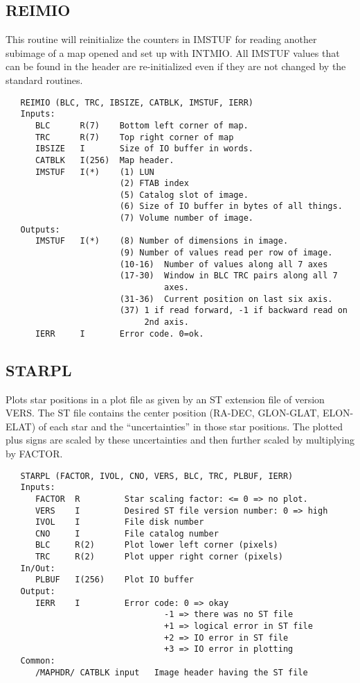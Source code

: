 \subsection{REIMIO}
This routine will reinitialize the counters in IMSTUF for reading
another subimage of a map opened and set up with INTMIO.  All
IMSTUF values that can be found in the header are re-initialized
even if they are not changed by the standard routines.
\begin{verbatim}
   REIMIO (BLC, TRC, IBSIZE, CATBLK, IMSTUF, IERR)
   Inputs:
      BLC      R(7)    Bottom left corner of map.
      TRC      R(7)    Top right corner of map
      IBSIZE   I       Size of IO buffer in words.
      CATBLK   I(256)  Map header.
      IMSTUF   I(*)    (1) LUN
                       (2) FTAB index
                       (5) Catalog slot of image.
                       (6) Size of IO buffer in bytes of all things.
                       (7) Volume number of image.
   Outputs:
      IMSTUF   I(*)    (8) Number of dimensions in image.
                       (9) Number of values read per row of image.
                       (10-16)  Number of values along all 7 axes
                       (17-30)  Window in BLC TRC pairs along all 7
                                axes.
                       (31-36)  Current position on last six axis.
                       (37) 1 if read forward, -1 if backward read on
                            2nd axis.
      IERR     I       Error code. 0=ok.

\end{verbatim}

\subsection{STARPL}
Plots star positions in a plot file as given by an ST
extension file of version VERS.  The ST file contains the center
position (RA-DEC, GLON-GLAT, ELON-ELAT) of each star and the
``uncertainties'' in those star positions.  The plotted plus signs
are scaled by these uncertainties and then further scaled by
multiplying by FACTOR.
\begin{verbatim}
   STARPL (FACTOR, IVOL, CNO, VERS, BLC, TRC, PLBUF, IERR)
   Inputs:
      FACTOR  R         Star scaling factor: <= 0 => no plot.
      VERS    I         Desired ST file version number: 0 => high
      IVOL    I         File disk number
      CNO     I         File catalog number
      BLC     R(2)      Plot lower left corner (pixels)
      TRC     R(2)      Plot upper right corner (pixels)
   In/Out:
      PLBUF   I(256)    Plot IO buffer
   Output:
      IERR    I         Error code: 0 => okay
                                -1 => there was no ST file
                                +1 => logical error in ST file
                                +2 => IO error in ST file
                                +3 => IO error in plotting
   Common:
      /MAPHDR/ CATBLK input   Image header having the ST file

\end{verbatim}

\newpage

